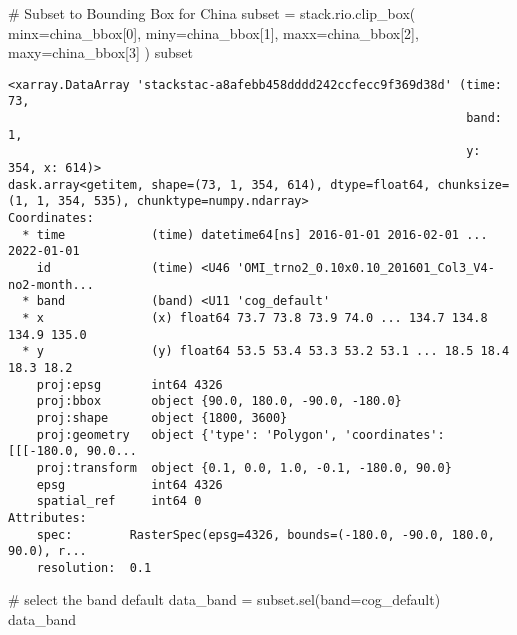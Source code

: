 \documentclass[
  letterpaper,
  DIV=11,
  numbers=noendperiod]{scrreprt}
\newenvironment{Shaded}{\begin{snugshade}}{\end{snugshade}}
\newcommand{\CommentTok}[1]{\textcolor[rgb]{0.37,0.37,0.37}{#1}}
\newcommand{\DecValTok}[1]{\textcolor[rgb]{0.68,0.00,0.00}{#1}}
\newcommand{\NormalTok}[1]{\textcolor[rgb]{0.00,0.46,0.62}{#1}}
\newcommand{\OperatorTok}[1]{\textcolor[rgb]{0.37,0.37,0.37}{#1}}
\newcommand{\StringTok}[1]{\textcolor[rgb]{0.13,0.47,0.30}{#1}}
\begin{document}
\begin{Shaded}
\begin{Highlighting}[]
\CommentTok{\# Subset to Bounding Box for China}
\NormalTok{subset }\OperatorTok{=}\NormalTok{ stack.rio.clip\_box(}
\NormalTok{    minx}\OperatorTok{=}\NormalTok{china\_bbox[}\DecValTok{0}\NormalTok{],}
\NormalTok{    miny}\OperatorTok{=}\NormalTok{china\_bbox[}\DecValTok{1}\NormalTok{],}
\NormalTok{    maxx}\OperatorTok{=}\NormalTok{china\_bbox[}\DecValTok{2}\NormalTok{],}
\NormalTok{    maxy}\OperatorTok{=}\NormalTok{china\_bbox[}\DecValTok{3}\NormalTok{]}
\NormalTok{)}
\NormalTok{subset}
\end{Highlighting}
\end{Shaded}

\begin{verbatim}
<xarray.DataArray 'stackstac-a8afebb458dddd242ccfecc9f369d38d' (time: 73,
                                                                band: 1,
                                                                y: 354, x: 614)>
dask.array<getitem, shape=(73, 1, 354, 614), dtype=float64, chunksize=(1, 1, 354, 535), chunktype=numpy.ndarray>
Coordinates:
  * time            (time) datetime64[ns] 2016-01-01 2016-02-01 ... 2022-01-01
    id              (time) <U46 'OMI_trno2_0.10x0.10_201601_Col3_V4-no2-month...
  * band            (band) <U11 'cog_default'
  * x               (x) float64 73.7 73.8 73.9 74.0 ... 134.7 134.8 134.9 135.0
  * y               (y) float64 53.5 53.4 53.3 53.2 53.1 ... 18.5 18.4 18.3 18.2
    proj:epsg       int64 4326
    proj:bbox       object {90.0, 180.0, -90.0, -180.0}
    proj:shape      object {1800, 3600}
    proj:geometry   object {'type': 'Polygon', 'coordinates': [[[-180.0, 90.0...
    proj:transform  object {0.1, 0.0, 1.0, -0.1, -180.0, 90.0}
    epsg            int64 4326
    spatial_ref     int64 0
Attributes:
    spec:        RasterSpec(epsg=4326, bounds=(-180.0, -90.0, 180.0, 90.0), r...
    resolution:  0.1
\end{verbatim}

\begin{Shaded}
\begin{Highlighting}[]
\CommentTok{\# select the band default}
\NormalTok{data\_band }\OperatorTok{=}\NormalTok{ subset.sel(band}\OperatorTok{=}\StringTok{\textquotesingle{}cog\_default\textquotesingle{}}\NormalTok{)}
\NormalTok{data\_band}
\end{Highlighting}
\end{Shaded}
\end{document}

